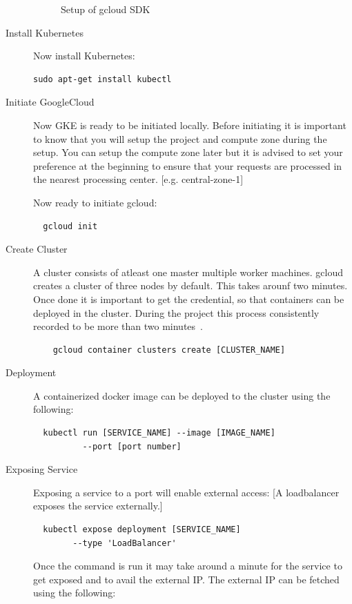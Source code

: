 \begin{description}
\begin{figure}[htb]
\begin{footnotesize}
\end{footnotesize}
\caption{Setup of gcloud SDK}\label{F:setup}
\end{figure}


\item[Install Kubernetes] Now install Kubernetes:

\begin{verbatim}
sudo apt-get install kubectl
\end{verbatim}

\item[Initiate GoogleCloud] Now GKE is ready to be initiated locally. Before
initiating it is important to know that you will setup the project and compute
zone during the setup. You can setup the compute zone later but it is advised
to set your preference at the beginning to ensure that your requests are
processed in the nearest processing center. [e.g. central-zone-1] 

Now ready to initiate gcloud:
\begin{verbatim}
  gcloud init
\end{verbatim}

\item[Create Cluster] A cluster consists of atleast one master multiple worker
machines. gcloud creates a cluster of three nodes by default. This takes
arounf two minutes. Once done it is important to get the credential, so that
containers can be deployed in the cluster. During the project this process
consistently recorded to be more than two
minutes~\cite{hid-sp18-417-cluster-creation-video}.

  \begin{verbatim}
    gcloud container clusters create [CLUSTER_NAME]
  \end{verbatim}
\item[Deployment] A containerized docker image can be deployed to the cluster
using the following:
\begin{verbatim}
  kubectl run [SERVICE_NAME] --image [IMAGE_NAME] 
          --port [port number]
\end{verbatim}
\item [Exposing Service] Exposing a service to a port will enable external
access: [A loadbalancer exposes the service externally.]
\begin{verbatim}
  kubectl expose deployment [SERVICE_NAME] 
        --type 'LoadBalancer'
\end{verbatim}

Once the command is run it may take around a minute for the service to get
exposed and to avail the external IP. The external IP can be fetched using the
following:


\end{description}
